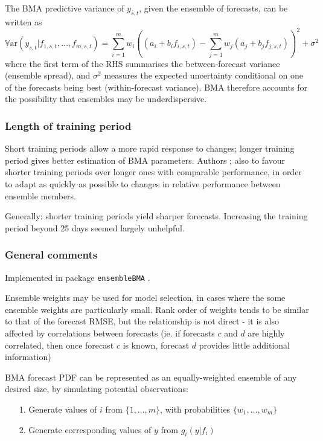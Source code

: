 \documentclass[10pt,fleqn]{article}
\begin{document}
The BMA predictive variance of $y_{s,t}$, given the ensemble of forecasts, can be written as
%
\[\mathbb{V}\text{ar}(y_{s,t} | f_{1,s,t}, \dots, f_{m,s,t}) = 
\sum_{i=1}^m w_i \left( (a_i + b_i f_{i,s,t}) - 
\sum_{j=1}^m w_j (a_j + b_j f_{j,s,t}) \right) ^2 + \sigma^2\]
%
where the first term of the RHS summarises the between-forecast variance (ensemble spread), and $\sigma^2$ measures the expected uncertainty conditional on one of the forecasts being best (within-forecast variance). BMA therefore accounts for the possibility that ensembles may be underdispersive.

\subsubsection{Length of training period}

Short training periods allow a more rapid response to changes; longer training period gives better estimation of BMA parameters. Authors ; also to favour shorter training periods over longer ones with comparable performance, in order to adapt as quickly as possible to changes in relative performance between ensemble members.

Generally: shorter training periods yield sharper forecasts. Increasing the training period beyond 25 days seemed largely unhelpful.

\subsubsection{General comments}

Implemented in package \texttt{ensembleBMA} \cite{Fraley2007}.

Ensemble weights may be used for model selection, in cases where the some ensemble weights are particularly small. Rank order of weights tends to be similar to that of the forecast RMSE, but the relationship is not direct - it is also affected by correlations between forecasts (ie. if forecasts $c$ and $d$ are highly correlated, then once forecast $c$ is known, forecast $d$ provides little additional information)

BMA forecast PDF can be represented as an equally-weighted ensemble of any desired size, by simulating potential observations:
\begin{itemize}
\item[1.] Generate values of $i$ from $\{1, \dots, m\}$, with probabilities $\{w_1, \dots, w_m\}$
\item[2.] Generate corresponding values of $y$ from $g_i(y|f_i)$
\end{itemize}
\end{document}
